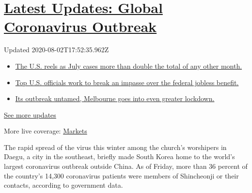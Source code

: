 \hypertarget{latest-updates-global-coronavirus-outbreak}{%
\section{\texorpdfstring{\href{https://www.nytimes3xbfgragh.onion/2020/08/01/world/coronavirus-covid-19.html?action=click\&pgtype=Article\&state=default\&region=MAIN_CONTENT_1\&context=storylines_live_updates}{Latest
Updates: Global Coronavirus
Outbreak}}{Latest Updates: Global Coronavirus Outbreak}}\label{latest-updates-global-coronavirus-outbreak}}

Updated 2020-08-02T17:52:35.962Z

\begin{itemize}
\tightlist
\item
  \href{https://www.nytimes3xbfgragh.onion/2020/08/01/world/coronavirus-covid-19.html?action=click\&pgtype=Article\&state=default\&region=MAIN_CONTENT_1\&context=storylines_live_updates\#link-34047410}{The
  U.S. reels as July cases more than double the total of any other
  month.}
\item
  \href{https://www.nytimes3xbfgragh.onion/2020/08/01/world/coronavirus-covid-19.html?action=click\&pgtype=Article\&state=default\&region=MAIN_CONTENT_1\&context=storylines_live_updates\#link-780ec966}{Top
  U.S. officials work to break an impasse over the federal jobless
  benefit.}
\item
  \href{https://www.nytimes3xbfgragh.onion/2020/08/01/world/coronavirus-covid-19.html?action=click\&pgtype=Article\&state=default\&region=MAIN_CONTENT_1\&context=storylines_live_updates\#link-2bc8948}{Its
  outbreak untamed, Melbourne goes into even greater lockdown.}
\end{itemize}

\href{https://www.nytimes3xbfgragh.onion/2020/08/01/world/coronavirus-covid-19.html?action=click\&pgtype=Article\&state=default\&region=MAIN_CONTENT_1\&context=storylines_live_updates}{See
more updates}

More live coverage:
\href{https://www.nytimes3xbfgragh.onion/live/2020/07/31/business/stock-market-today-coronavirus?action=click\&pgtype=Article\&state=default\&region=MAIN_CONTENT_1\&context=storylines_live_updates}{Markets}

The rapid spread of the virus this winter among the church's worshipers
in Daegu, a city in the southeast, briefly made South Korea home to the
world's largest coronavirus outbreak outside China. As of Friday, more
than 36 percent of the country's 14,300 coronavirus patients were
members of Shincheonji or their contacts, according to government data.

